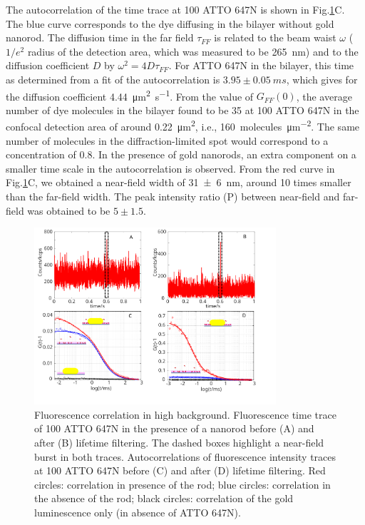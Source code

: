 The autocorrelation of the time trace at \SI{100}{\nM} ATTO 647N is shown in Fig.\ref{fig:corr_enhnc}C.
The blue curve corresponds to the dye diffusing in the bilayer without gold nanorod.
The diffusion time in the far field $\tau_{FF}$ is related to the beam waist $\omega$ ($1/e^2$ radius of the detection area, which was measured to be \SI{265}{\nm}) and to the diffusion coefficient $D$ by $\omega^2=4D\tau_{FF}$.
For ATTO 647N in the bilayer, this time as determined from a fit of the autocorrelation is $3.95\pm0.05~ms$, which gives for the diffusion coefficient \SI{4.44}{\um\squared\per\s}.
From the value of $G_{FF}(0)$, the average number of dye molecules in the bilayer found to be 35 at \SI{100}{\nM} ATTO 647N in the confocal detection area of around \SI{0.22}{\um\squared}, i.e., \SI{160}{ molecules\per\um\squared}.
The same number of molecules in the diffraction-limited spot would correspond to a concentration of \SI{0.8}{\uM}.
In the presence of gold nanorods, an extra component on a smaller time scale in the autocorrelation is observed.
From the red curve in Fig.\ref{fig:corr_enhnc}C, we obtained a near-field width of \SI[separate-uncertainty = true]{31(6)}{\nm}, around 10 times smaller than the far-field width.
The peak intensity ratio (P) between near-field and far-field was obtained to be $5\pm1.5$.

\begin{figure}[ht]
	\centering
	\includegraphics[width=0.8\textwidth]{corr_enhnc}
	\caption{Fluorescence correlation in high background. Fluorescence time trace of \SI{100}{\nM} ATTO 647N in the 
	presence of a nanorod before (A) and after (B) lifetime filtering. The dashed boxes highlight a near-field 
	burst in both traces. Autocorrelations of fluorescence intensity traces at \SI{100}{\nM} ATTO 647N before (C) and 
	after (D) lifetime filtering. Red circles: correlation in presence of the rod; blue circles: correlation in the 
	absence of the rod; black circles: correlation of the gold luminescence only (in absence of ATTO 647N).}
	\label{fig:corr_enhnc}
\end{figure}


